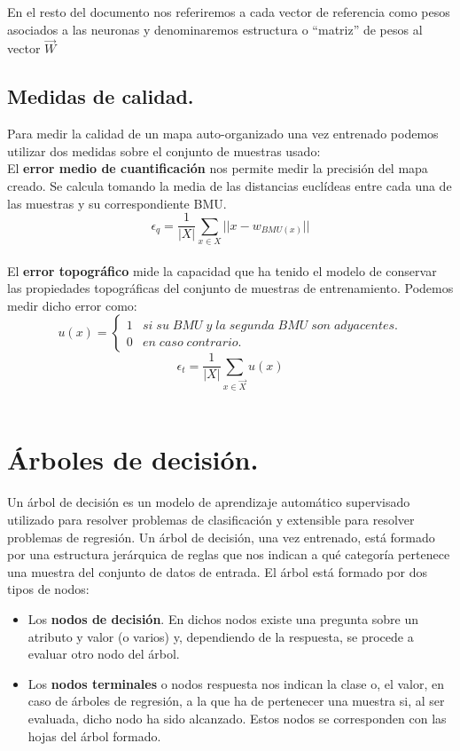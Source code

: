 En el resto del documento nos referiremos a cada vector de referencia como pesos asociados a las neuronas y denominaremos estructura o ``matriz'' de pesos al vector $\vec{W}$


\subsection{Medidas de calidad.}
Para medir la calidad de un mapa auto-organizado una vez entrenado podemos utilizar dos medidas sobre el conjunto de muestras usado:\\

El \textbf{error medio de cuantificación} nos permite medir la precisión del mapa creado. Se calcula tomando la media de las distancias euclídeas entre cada una de las muestras y su correspondiente BMU.\\

$$
\epsilon_q = \frac{1}{|X|}\sum_{x \in X}{||x-w_{BMU(x)}||}
$$\\

El \textbf{error topográfico} mide la capacidad que ha tenido el modelo de conservar las propiedades topográficas del conjunto de muestras de entrenamiento. Podemos medir dicho error como:\\
$$
u(x) = \left\{
\begin{array}{ll}
1 & si \; su \; BMU \; y \; la \; segunda \; BMU \; son \; adyacentes.\\
0 & en \; caso \; contrario.
\end{array}
\right.
$$
$$
\epsilon_t =  \frac{1}{|X|}\sum_{x \in \vec{X}} u(x)
$$\\

\section{Árboles de decisión.}
Un árbol de decisión \cite{arbol} es un modelo de aprendizaje automático supervisado utilizado para resolver problemas de clasificación y extensible para resolver problemas de regresión. Un árbol de decisión, una vez entrenado, está formado por una estructura jerárquica de reglas que nos indican a qué categoría pertenece una muestra del conjunto de datos de entrada. El árbol está formado por dos tipos de nodos:\\

\begin{itemize}
	\item Los \textbf{nodos de decisión}. En dichos nodos existe una pregunta sobre un atributo y valor (o varios) y, dependiendo de la respuesta, se procede a evaluar otro nodo del árbol.
	\item Los \textbf{nodos terminales} o nodos respuesta nos indican la clase o, el valor, en caso de árboles de regresión, a la que ha de pertenecer una muestra si, al ser evaluada, dicho nodo ha sido alcanzado. Estos nodos se corresponden con las hojas del árbol formado.
\end{itemize}


